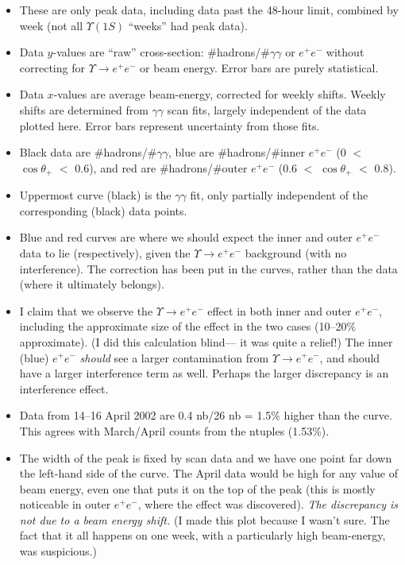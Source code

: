 \documentclass[12pt]{article}
\begin{document}
\begin{itemize}

\item These are only peak data, including data past the 48-hour limit,
combined by week (not all $\Upsilon(1S)$ ``weeks'' had peak data).

\item Data $y$-values are ``raw'' cross-section:
\#hadrons/\#$\gamma\gamma$ or $e^+e^-$ without correcting for
$\Upsilon \to e^+e^-$ or beam energy.  Error bars are purely
statistical.

\item Data $x$-values are average beam-energy, corrected for weekly
shifts.  Weekly shifts are determined from $\gamma\gamma$ scan fits,
largely independent of the data plotted here.  Error bars represent
uncertainty from those fits.

\item Black data are \#hadrons/\#$\gamma\gamma$, blue are
\#hadrons/\#inner $e^+e^-$ (0 $<$ $\cos\theta_+$ $<$ 0.6), and red are
\#hadrons/\#outer $e^+e^-$ (0.6 $<$ $\cos\theta_+$ $<$ 0.8).

\item Uppermost curve (black) is the $\gamma\gamma$ fit, only partially
independent of the corresponding (black) data points.

\item Blue and red curves are where we should expect the inner and
outer $e^+e^-$ data to lie (respectively), given the $\Upsilon \to
e^+e^-$ background (with no interference).  The correction has been
put in the curves, rather than the data (where it ultimately belongs).

\item I claim that we observe the $\Upsilon \to e^+e^-$ effect in both
inner and outer $e^+e^-$, including the approximate size of the effect
in the two cases (10--20\% approximate).  (I did this calculation
blind--- it was quite a relief!)  The inner (blue) $e^+e^-$ {\it
should} see a larger contamination from $\Upsilon \to e^+e^-$, and
should have a larger interference term as well.  Perhaps the larger
discrepancy is an interference effect.

\item Data from 14--16 April 2002 are 0.4 nb/26 nb = 1.5\% higher than
the curve.  This agrees with March/April counts from the ntuples
(1.53\%).

\item The width of the peak is fixed by scan data and we have one
point far down the left-hand side of the curve.  The April data would
be high for any value of beam energy, even one that puts it on the top
of the peak (this is mostly noticeable in outer $e^+e^-$, where the
effect was discovered).  {\it The discrepancy is not due to a beam
energy shift.}  (I made this plot because I wasn't sure.  The fact that
it all happens on one week, with a particularly high beam-energy, was
suspicious.)


\end{itemize}
\end{document}

